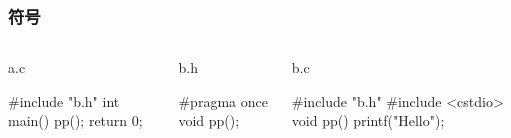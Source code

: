 \documentclass[UTF8,lualatex]{ctexbeamer}
\begin{document}
\begin{frame}[fragile,t]
    \frametitle{符号}
    \scriptsize
    \begin{columns}[t]
        \begin{column}{.3\textwidth}
            \begin{exampleblock}{a.c}
                \begin{cppcode}
                    #include "b.h"
                    int main() {
                        pp();
                        return 0;
                    }
                \end{cppcode}
            \end{exampleblock}
        \end{column}
        \begin{column}{.33\textwidth}
            \begin{exampleblock}{b.h}
                \begin{cppcode}
                    #pragma once
                    void pp();
                \end{cppcode}
            \end{exampleblock}
        \end{column}
        \begin{column}{.33\textwidth}
            \begin{exampleblock}{b.c}
                \begin{cppcode}
                    #include "b.h"
                    #include <cstdio>
                    void pp() {
                        printf("Hello\n");
                    }
                \end{cppcode}
            \end{exampleblock}
        \end{column}
    \end{columns}
    \begin{block}{~}
    \end{block}
\end{frame}

\end{document}
